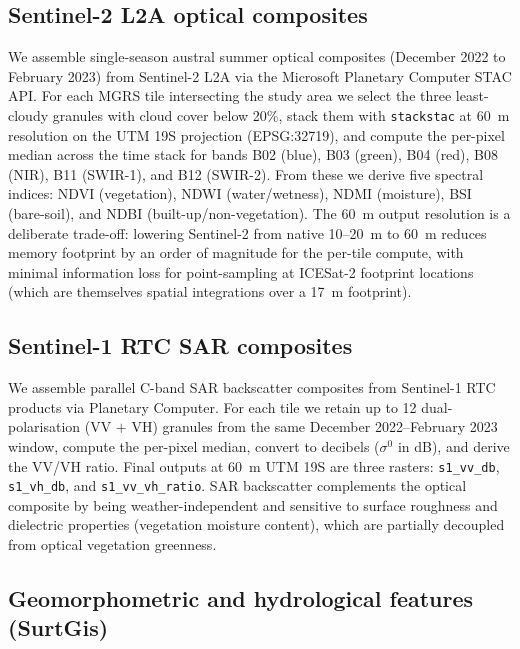 \documentclass[preprint,authoryear,number]{elsarticle}
\begin{document}
\subsection{Sentinel-2 L2A optical composites}
\label{sec:sentinel2}

We assemble single-season austral summer optical composites (December 2022 to February 2023) from Sentinel-2 L2A \citep{Drusch2012Sentinel2} via the Microsoft Planetary Computer STAC API. For each MGRS tile intersecting the study area we select the three least-cloudy granules with cloud cover below 20\%, stack them with \texttt{stackstac} at \SI{60}{\meter} resolution on the UTM 19S projection (EPSG:32719), and compute the per-pixel median across the time stack for bands B02 (blue), B03 (green), B04 (red), B08 (NIR), B11 (SWIR-1), and B12 (SWIR-2). From these we derive five spectral indices: NDVI (vegetation), NDWI (water/wetness), NDMI (moisture), BSI (bare-soil), and NDBI (built-up/non-vegetation). The \SI{60}{\meter} output resolution is a deliberate trade-off: lowering Sentinel-2 from native 10--\SI{20}{\meter} to \SI{60}{\meter} reduces memory footprint by an order of magnitude for the per-tile compute, with minimal information loss for point-sampling at ICESat-2 footprint locations (which are themselves spatial integrations over a \SI{17}{\meter} footprint).

\subsection{Sentinel-1 RTC SAR composites}
\label{sec:sentinel1}

We assemble parallel C-band SAR backscatter composites from Sentinel-1 RTC products \citep{Torres2012Sentinel1} via Planetary Computer. For each tile we retain up to 12 dual-polarisation (VV $+$ VH) granules from the same December 2022--February 2023 window, compute the per-pixel median, convert to decibels ($\sigma^{0}$ in dB), and derive the VV/VH ratio. Final outputs at \SI{60}{\meter} UTM 19S are three rasters: \texttt{s1\_vv\_db}, \texttt{s1\_vh\_db}, and \texttt{s1\_vv\_vh\_ratio}. SAR backscatter complements the optical composite by being weather-independent and sensitive to surface roughness and dielectric properties (vegetation moisture content), which are partially decoupled from optical vegetation greenness.

\subsection{Geomorphometric and hydrological features (SurtGis)}
\label{sec:surtgis}
\end{document}
